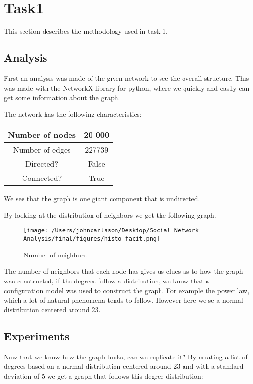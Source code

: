 \documentclass[conference]{IEEEtran}
\begin{document}
\section{Task1}
This section describes the methodology used in task 1.

\subsection{Analysis}
First an analysis was made of the given network to see the overall structure. This was made with the NetworkX
library for python, where we quickly and easily can get some information about the graph.


The network has the following characteristics:
\begin{center}
    \begin{tabular}{|c|c|}
        
        \hline
        Number of nodes & 20 000 \\
        \hline
        Number of edges & 227739 \\
        \hline
        Directed? & False \\
        \hline
        Connected? & True \\
        \hline
    \end{tabular}

\end{center}

We see that the graph is one giant component that is undirected.


By looking at the distribution of neighbors we get the following graph.
\begin{figure}[h]
    \centering
    \caption{Number of neighbors}
\texttt{[image: /Users/johncarlsson/Desktop/Social Network Analysis/final/figures/histo\_facit.png]}
\end{figure}

The number of neighbors that each node has gives us clues as to how the graph was constructed, if the degrees follow
a distribution, we know that a configuration model was used to construct the graph. For example the power law,
which a lot of natural phenomena tends to follow. However here we se a normal distribution centered around 23.

\subsection[short]{Experiments}
Now that we know how the graph looks, can we replicate it? 
By creating a list of degrees based on a normal distribution centered around 23 and with a 
standard deviation of 5 we get a graph that follows this degree distribution:
\end{document}
